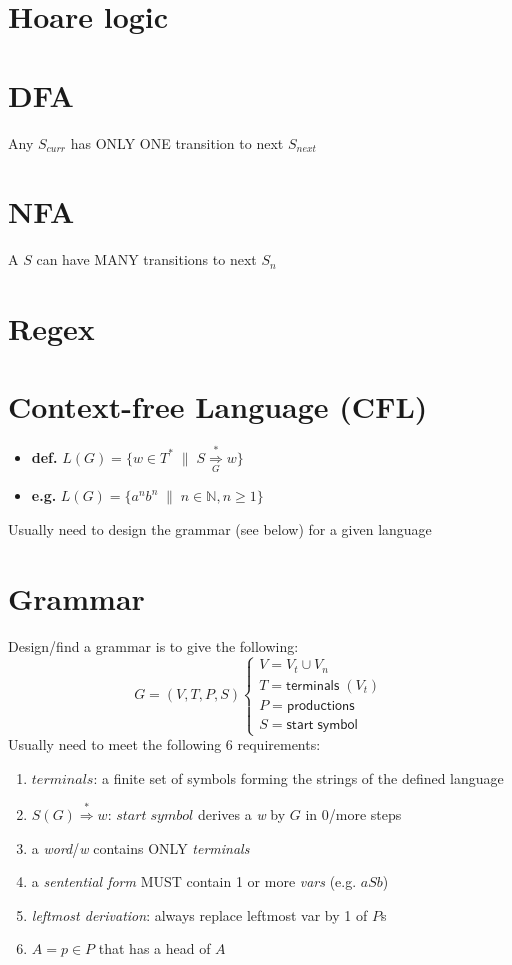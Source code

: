 \documentclass[10pt,a4paper,landscape]{article}
\begin{document}
\pagestyle{empty}

\begin{multicols*}{3}
\section*{Hoare logic}
% 
\section*{DFA}
Any \(S_{curr}\) has ONLY ONE transition to next \(S_{next}\)
\section*{NFA}
A \(S\) can have MANY transitions to next \(S_{n}\)
\section*{Regex}
\section*{Context-free Language (CFL)}
\newcommand{\derive}[2]{\overset{#1}{\underset{#2}{\Rightarrow}}}
\newcommand{\gor}{\;|\;}
\begin{itemize}
\item \textbf{def.
  } \(L(G) = \{w \in T^{*} \;\|\; S \derive{*}{G} w\}\)
\item \textbf{e.g.} \(L(G) = \{a^{n}b^{n} \;\|\; n \in \mathbb{N}, n \geq 1\}\)
\end{itemize}
Usually need to design the grammar (see below) for a given language
\section*{Grammar}
Design/find a grammar is to give the following:
\[
G = (V,T,P,S)\left\{
    \begin{array}{l}
      V = V_{t} \cup V_{n} \\
      T = \mathsf{terminals}\; (V_{t}) \\
      P = \mathsf{productions} \\
      S = \mathsf{start \; symbol}
    \end{array}
    \right.
\]
Usually need to meet the following 6 requirements:
\begin{enumerate}
\item \(terminals\): a finite set of symbols forming the strings of the defined language
\item \(S(G) \overset{*}{\Rightarrow} w\): \(start\; symbol\) derives a \emph{w} by \(G\) in 0/more steps
\item a \emph{word}/\emph{w} contains ONLY \emph{terminals}
\item a \emph{sentential form} MUST contain 1 or more \emph{vars} (e.g. \(aSb\))
\item \emph{leftmost derivation}: always replace leftmost var by 1 of \(P\)s
\item \(A = p \in P\) that has a head of \(A\)
\end{enumerate}

\end{multicols*}
\end{document}
